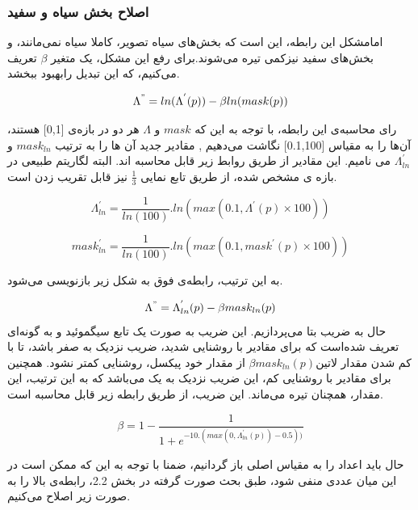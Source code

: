 \subsubsection{اصلاح بخش سیاه و سفید}
امامشکل این رابطه، این است که بخش‌های سیاه تصویر، کاملا سیاه نمی‌مانند، و بخش‌های سفید نیزکمی تیره می‌شوند.برای رفع این مشکل، یک متغیر $ \beta$ تعریف می‌کنیم، که این تبدیل‌ رابهبود ببخشد.


\begin{equation}
	\Lambda^{"} = ln(\Lambda^{'}(p)) - \beta ln(mask(p))
\end{equation}

رای محاسبه‌ی این رابطه، با توجه به این که $mask$ و $\Lambda$ هر دو در بازه‌‌ی [0,1] هستند، آن‌ها را به مقیاس [0.1,100] نگاشت می‌دهیم , مقادیر جدید آن ها را به ترتیب $mask_{ln}$ و $\Lambda^{'}_{ln}$ می نامیم. این مقادیر از طریق روابط زیر قابل محاسبه اند. البته لگاریتم طبیعی در بازه ی مشخص شده، از طریق تابع نمایی $\frac{1}{3}$ نیز قابل تقریب زدن است.


\begin{equation}
	\Lambda^{'}_{ln} = \frac{1}{ln(100)}.ln(max(0.1, \Lambda^{'}(p)\times 100))
\end{equation}	

\begin{equation}	
	mask^{'}_{ln} = \frac{1}{ln(100)}.ln(max(0.1, mask^{'}(p)\times 100))	
\end{equation}

به این ترتیب، رابطه‌ی فوق به شکل زیر بازنویسی می‌شود.


\begin{equation}
	\Lambda^{"} = \Lambda^{'}_{ln}(p) - \beta mask_{ln}(p)
\end{equation}
حال به ضریب بتا می‌پردازیم.
این ضریب به  صورت یک تابع سیگموئید و به گونه‌ای تعریف شده‌است که برای مقادیر با روشنایی شدید، ضریب نزدیک به صفر باشد، تا با کم شدن مقدار 
‌لاتین{$ \beta mask_{ln}(p) $ }
از مقدار خود پیکسل، روشنایی کمتر نشود. همچنین برای مقادیر با روشنایی کم، این ضریب نزدیک به یک می‌باشد که به این ترتیب، این مقدار، همچنان تیره می‌ماند. این ضریب، از طریق رابطه زیر قابل محاسبه است.


\begin{equation}
	\beta = 1 - \frac{1}{1 + e^{-10.(max(0, \Lambda^{'}_{ln}(p)) - 0.5))}}
\end{equation}

حال باید اعداد را به مقیاس اصلی باز گردانیم، ضمنا با توجه به این که ممکن است در این میان عددی منفی شود، طبق بحث صورت گرفته در بخش 2.2، رابطه‌ی بالا را به صورت زیر اصلاح می‌کنیم.

